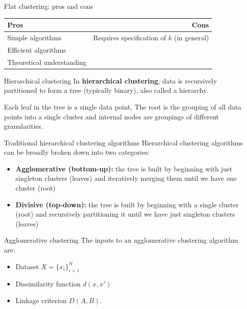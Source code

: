 \documentclass[10pt, compress]{beamer}
\begin{document}
\begin{frame}{Flat clustering: pros and cons}
  \begin{table}
    \begin{tabular}{lr}
      \toprule
      Pros & Cons \\
      \midrule
      Simple algorithms &  Requires specification of $k$ (in general)\\
      Efficient algorithms & \\
      Theoretical understanding & \\
      \bottomrule
    \end{tabular}
  \end{table}
\end{frame}

\begin{frame}{Hierarchical clustering}
  In \textbf{hierarchical clustering}, data
  is recursively partitioned to form a tree (typically binary),
  also called a hierarchy.


  Each leaf in the tree is a single data point,
  The root is the grouping of all data points
  into a single cluster and internal nodes
  are groupings of different granularities.
\end{frame}

\begin{frame}{Traditional hierarchical clustering algorithms}
  Hierarchical clustering algorithms can be broadly broken
  down into two categories:

  \begin{itemize}
    \item<2-> \textbf{Agglomerative (bottom-up):} the tree is built by
      beginning with just singleton clusters (leaves) and
      iteratively merging them until we have one cluster (root)
    \item<3-> \textbf{Divisive (top-down):} the tree is built
      by beginning with a single cluster (root) and
      recursively partitioning it until we
      have just singleton clusters (leaves)
  \end{itemize}
\end{frame}

\begin{frame}{Agglomerative clustering}
  The inputs to an agglomerative clustering algorithm
  are:
  \begin{itemize}
    \item<2-> Dataset $X = \{x_i\}_{i = 1}^N$
    \item<3-> Dissimilarity function $d(x, x')$
    \item<4-> Linkage criterion $D(A, B)$.
  \end{itemize}

\end{frame}
\end{document}
